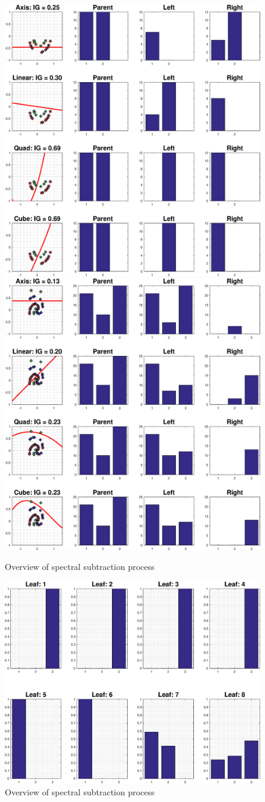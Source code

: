 \documentclass[a4paper,pra,twocolumn,10pt,aps,longbibliography,nobalancelastpage]{revtex4-1}
\begin{document}
\begin{figure}[H]
    \includegraphics[width=0.49\columnwidth]{split_function_visualitions_3}
    \includegraphics[width=0.49\columnwidth]{split_function_visualitions_4}
    \caption{Overview of spectral subtraction process}
    \label{fig:spec_sub_overview}
\end{figure}

\begin{figure}[H]
    \includegraphics[width=\columnwidth]{leaf_node_distributions}
    \caption{Overview of spectral subtraction process}
    \label{fig:spec_sub_overview}
\end{figure}
\end{document}
